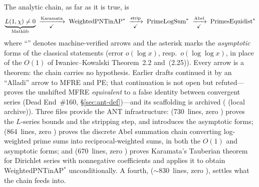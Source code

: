 The analytic chain, as far as it is true, is
\[
  \underbrace{L(1,\chi) \neq 0}_{\text{Mathlib}}
  \;\xrightarrow[\text{\small \checkmark}]{\text{Karamata}}\;
  \text{WeightedPNTinAP}^{\ast}
  \;\xrightarrow[\text{\small \checkmark}]{\text{strip}}\;
  \text{PrimeLogSum}^{\ast}
  \;\xrightarrow[\text{\small \checkmark}]{\text{Abel}}\;
  \text{PrimesEquidist}^{\ast}
\]
where ``\checkmark'' denotes machine-verified arrows and the asterisk
marks the \emph{asymptotic} forms of the classical statements
(error $o(\log x)$, resp.\ $o(\log\log x)$, in place of the $O(1)$
of Iwaniec--Kowalski Theorem~2.2 and~(2.25)).  Every arrow is a
theorem: the chain carries no hypothesis.  Earlier drafts continued it
by an ``Alladi'' arrow to MFRE and PE; that continuation is not open but
refuted--- proves the unshifted
MFRE \emph{equivalent} to a false identity between convergent series
(Dead End~\#160, \S\ref{sec:ant-def})---and its scaffolding is archived
( (local archive)).
Three files provide the ANT infrastructure:
 (730~lines, zero )
proves the $L$-series bounds and the stripping step, and introduces the
asymptotic forms;
 (864~lines, zero ) proves the
discrete Abel summation chain converting log-weighted prime
sums into reciprocal-weighted sums, in both the $O(1)$ and asymptotic
forms; and
 (670~lines, zero ) proves
Karamata's Tauberian theorem for Dirichlet series with nonnegative
coefficients and applies it to obtain WeightedPNTinAP$^{\ast}$
unconditionally.  A fourth, 
(${\sim}830$~lines, zero ), settles what the chain feeds
into.

